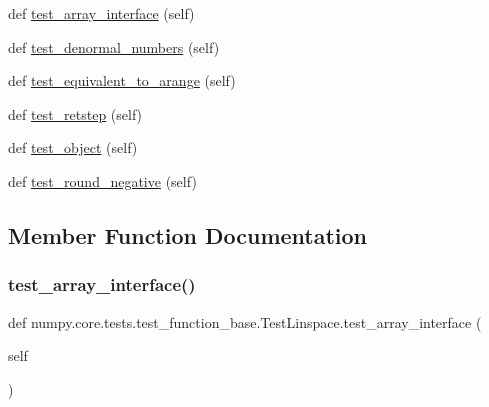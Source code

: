 \begin{DoxyCompactItemize}
\item 
def \hyperlink{classnumpy_1_1core_1_1tests_1_1test__function__base_1_1TestLinspace_a81aeb3b2a5c26a955f11808f4510298e}{test\+\_\+array\+\_\+interface} (self)
\item 
def \hyperlink{classnumpy_1_1core_1_1tests_1_1test__function__base_1_1TestLinspace_a77904c0c4db423753b1b970af9e1070c}{test\+\_\+denormal\+\_\+numbers} (self)
\item 
def \hyperlink{classnumpy_1_1core_1_1tests_1_1test__function__base_1_1TestLinspace_aec0d960772f8bfb9af6db380af9bdb12}{test\+\_\+equivalent\+\_\+to\+\_\+arange} (self)
\item 
def \hyperlink{classnumpy_1_1core_1_1tests_1_1test__function__base_1_1TestLinspace_ad7a70a2e09e9c30d5cbf0b4510b1e5ac}{test\+\_\+retstep} (self)
\item 
def \hyperlink{classnumpy_1_1core_1_1tests_1_1test__function__base_1_1TestLinspace_a21bc2ea08594123454fdfa58ca99994f}{test\+\_\+object} (self)
\item 
def \hyperlink{classnumpy_1_1core_1_1tests_1_1test__function__base_1_1TestLinspace_a27e2d0c39c1177947cd41819ab3c1728}{test\+\_\+round\+\_\+negative} (self)
\end{DoxyCompactItemize}


\subsection{Member Function Documentation}
\mbox{\label{classnumpy_1_1core_1_1tests_1_1test__function__base_1_1TestLinspace_a81aeb3b2a5c26a955f11808f4510298e}} 
\subsubsection{\texorpdfstring{test\+\_\+array\+\_\+interface()}{test\_array\_interface()}}
{\footnotesize\ttfamily def numpy.\+core.\+tests.\+test\+\_\+function\+\_\+base.\+Test\+Linspace.\+test\+\_\+array\+\_\+interface (\begin{DoxyParamCaption}\item[{}]{self }\end{DoxyParamCaption})}

